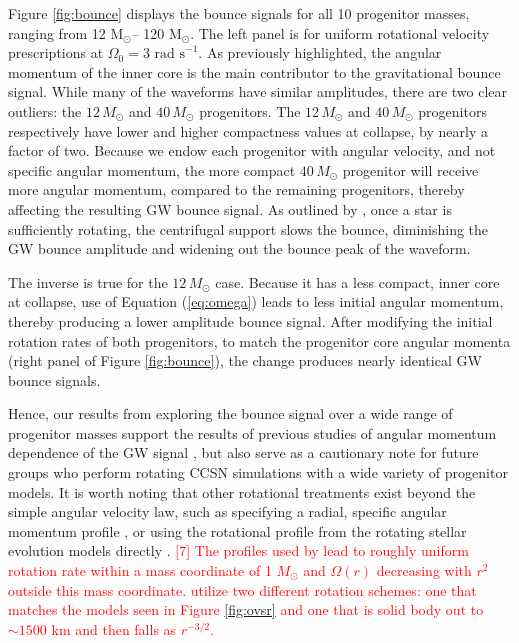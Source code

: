 \documentclass[twocolumn,times]{aastex62}  %
\newcommand{\Msun}{\ensuremath{\mathrm{M}_\odot}\xspace}
\begin{document}
Figure \ref{fig:bounce} displays the bounce signals for all 10 progenitor masses, ranging from 12 \Msun -- 120 \Msun.  The left panel is for uniform rotational velocity prescriptions at $\Omega_0 = 3\text{ rad s}^{-1}$.  As previously highlighted, the angular momentum of the inner core is the main contributor to the gravitational bounce signal.  While many of the waveforms have similar amplitudes, there are two clear outliers: the $12\,M_\odot$ and $40\,M_\odot$ progenitors.  The $12\,M_\odot$ and $40\,M_\odot$ progenitors respectively have lower and higher compactness values at collapse, by nearly a factor of two.  Because we endow each progenitor with angular velocity, and not specific angular momentum, the more compact $40\,M_\odot$ progenitor will receive more angular momentum, compared to the remaining progenitors, thereby affecting the resulting GW bounce signal.  As outlined by \citet{dimm:2008}, once a star is sufficiently rotating, the centrifugal support slows the bounce, diminishing the GW bounce amplitude and widening out the bounce peak of the waveform.  

The inverse is true for the $12\,M_\odot$ case.  Because it has a less compact, inner core at collapse, use of Equation (\ref{eq:omega}) leads to less initial angular momentum, thereby producing a lower amplitude bounce signal.  After modifying the initial rotation rates of both progenitors, to match the progenitor core angular momenta (right panel of Figure \ref{fig:bounce}), the change produces nearly identical GW bounce signals.  

Hence, our results from exploring the bounce signal over a wide range of progenitor masses support the results of previous studies of angular momentum dependence of the GW signal \citep{dimm:2008,abdik:2010,abdik:2014}, but also serve as a cautionary note for future groups who perform rotating CCSN simulations with a wide variety of progenitor models.  
It is worth noting that other rotational treatments exist beyond the simple angular velocity law, such as specifying a radial, specific angular momentum profile \citep[eg.][]{oconnor:2011}, or using the rotational profile from the rotating stellar evolution models directly \citep{summa:2018}.  \textcolor{red}{[7]  The profiles used by \citet{oconnor:2011} lead to roughly uniform rotation rate within a mass coordinate of 1 $M_\odot$ and $\Omega(r)$ decreasing with  $r^{2}$ outside this mass coordinate.  \citet{summa:2018} utilize two different rotation schemes: one that matches the \citet{heger:2005} models seen in Figure \ref{fig:ovsr} and one that is solid body out to $\sim 1500$ km and then falls as $r^{-3/2}$.}
\end{document}
